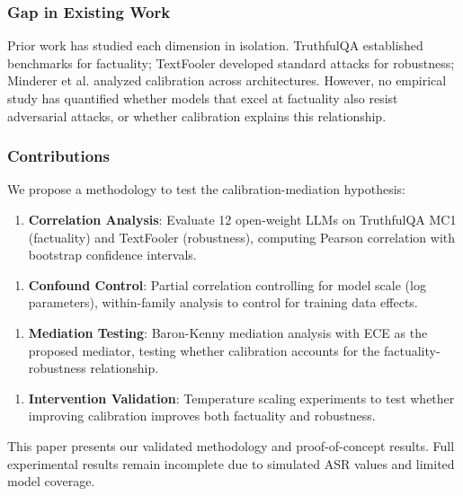 \subsubsection{Gap in Existing Work}

Prior work has studied each dimension in isolation. TruthfulQA established benchmarks for factuality; TextFooler developed standard attacks for robustness; Minderer et al. analyzed calibration across architectures. However, no empirical study has quantified whether models that excel at factuality also resist adversarial attacks, or whether calibration explains this relationship.

\subsubsection{Contributions}

We propose a methodology to test the calibration-mediation hypothesis:

\begin{enumerate}
\item \textbf{Correlation Analysis}: Evaluate 12 open-weight LLMs on TruthfulQA MC1 (factuality) and TextFooler (robustness), computing Pearson correlation with bootstrap confidence intervals.
\end{enumerate}

\begin{enumerate}
\item \textbf{Confound Control}: Partial correlation controlling for model scale (log parameters), within-family analysis to control for training data effects.
\end{enumerate}

\begin{enumerate}
\item \textbf{Mediation Testing}: Baron-Kenny mediation analysis with ECE as the proposed mediator, testing whether calibration accounts for the factuality-robustness relationship.
\end{enumerate}

\begin{enumerate}
\item \textbf{Intervention Validation}: Temperature scaling experiments to test whether improving calibration improves both factuality and robustness.
\end{enumerate}

This paper presents our validated methodology and proof-of-concept results. Full experimental results remain incomplete due to simulated ASR values and limited model coverage.

